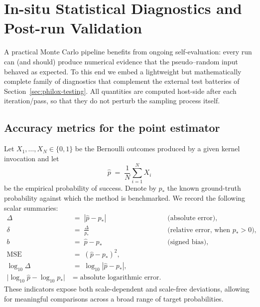 \section{In-situ Statistical Diagnostics and Post-run Validation}
A practical Monte Carlo pipeline benefits from ongoing self-evaluation: every run can (and should) produce numerical evidence that the pseudo–random input behaved as expected.  To this end we embed a 
lightweight but mathematically complete family of diagnostics that complement the external test batteries of Section~\ref{sec:philox-testing}. All quantities are computed host-side after each iteration/pass, so that they do not perturb the sampling process itself.

\subsection{Accuracy metrics for the point estimator}
Let $X_1,\dots,X_N\in\{0,1\}$ be the Bernoulli outcomes produced by a given kernel invocation and let
\begin{equation}
  \hat p \;=\; \frac{1}{N}\sum_{i=1}^{N} X_i
  \label{eq:p_hat}
\end{equation}
be the empirical probability of success.  Denote by $p_*$ the known ground-truth probability against which the method is benchmarked.  We record the following scalar summaries:
\begin{align}
  \Delta   &\;=\; |\hat p - p_*| \quad &&\text{(absolute error)},\\[4pt]
  \delta   &\;=\; \frac{\Delta}{p_*} &&\text{(relative error, when }p_*>0),\\[4pt]
  b        &\;=\; \hat p - p_* &&\text{(signed bias)},\\[4pt]
  \operatorname{MSE} &\;=\; (\hat p - p_*)^{2},\\[4pt]
  \log_{10}\!\Delta &\;=\; \log_{10}|\hat p - p_*|,\\[4pt]
  \bigl|\log_{10}\hat p - \log_{10}p_*\bigr| &\;=\; \text{absolute logarithmic error.}
\end{align}
These indicators expose both scale-dependent and scale-free deviations, allowing for meaningful comparisons across a broad range of target probabilities.

